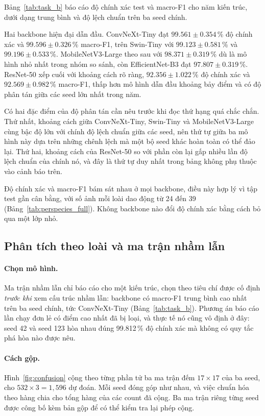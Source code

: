 Bảng~\ref{tab:task_b} báo cáo độ chính xác test và macro-F1 cho năm kiến trúc,
dưới dạng trung bình và độ lệch chuẩn trên ba seed chính.



Hai backbone hiện đại dẫn đầu. ConvNeXt-Tiny đạt
$99.561 \pm 0.354$\,\% độ chính xác và $99.596 \pm 0.326$\,\% macro-F1,
trên Swin-Tiny với $99.123 \pm 0.581$\,\% và $99.196 \pm 0.533$\,\%.
MobileNetV3-Large theo sau với $98.371 \pm 0.319$\,\% dù là mô hình nhỏ nhất
trong nhóm so sánh, còn EfficientNet-B3 đạt $97.807 \pm 0.319$\,\%. ResNet-50
xếp cuối với khoảng cách rõ ràng, $92.356 \pm 1.022$\,\% độ chính xác và
$92.569 \pm 0.982$\,\% macro-F1, thấp hơn mô hình dẫn đầu khoảng bảy điểm
và có độ phân tán giữa các seed lớn nhất trong năm.

Có hai đặc điểm của độ phân tán cần nêu trước khi đọc thứ hạng quá chắc chắn.
Thứ nhất, khoảng cách giữa ConvNeXt-Tiny, Swin-Tiny và MobileNetV3-Large cùng
bậc độ lớn với chính độ lệch chuẩn giữa các seed, nên thứ tự giữa ba mô hình
này dựa trên những chênh lệch mà một bộ seed khác hoàn toàn có thể đảo lại.
Thứ hai, khoảng cách của ResNet-50 so với phần còn lại gấp nhiều lần độ lệch
chuẩn của chính nó, và đây là thứ tự duy nhất trong bảng không phụ thuộc vào
cảnh báo trên.

Độ chính xác và macro-F1 bám sát nhau ở mọi backbone, điều này hợp lý vì tập
test gần cân bằng, với số ảnh mỗi loài dao động từ 24 đến 39
(Bảng~\ref{tab:perspecies_full}). Không backbone nào đổi độ chính xác bằng
cách bỏ qua một lớp nhỏ.

\subsection{Phân tích theo loài và ma trận nhầm lẫn}
\label{vi:sec:results:perspecies}

\paragraph{Chọn mô hình.} Ma trận nhầm lẫn chỉ báo cáo cho một kiến trúc, chọn
theo tiêu chí được cố định \emph{trước khi} xem cấu trúc nhầm lẫn: backbone có
macro-F1 trung bình cao nhất trên ba seed chính, tức ConvNeXt-Tiny
(Bảng~\ref{tab:task_b}). Phương án báo cáo lần chạy đơn lẻ có điểm cao nhất đã
bị loại, và thực tế nó cũng vô định ở đây: seed 42 và seed 123 hòa nhau đúng
99.812\,\% độ chính xác mà không có quy tắc phá hòa nào được nêu.

\paragraph{Cách gộp.} Hình~\ref{fig:confusion} cộng theo từng phần tử ba ma
trận đếm $17\times17$ của ba seed, cho $532\times3 = 1{,}596$ dự đoán. Mỗi
seed đóng góp như nhau, và việc chuẩn hóa theo hàng chia cho tổng hàng của
các count đã cộng. Ba ma trận riêng từng seed được công bố kèm bản gộp để có
thể kiểm tra lại phép cộng.

